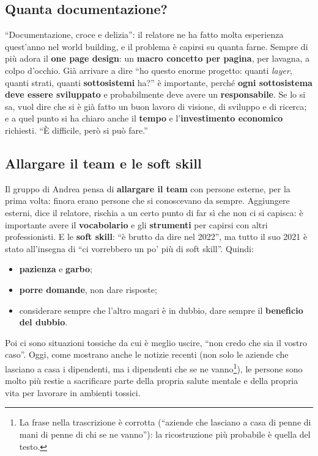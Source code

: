 \subsection{Quanta documentazione?}

``Documentazione, croce e delizia'': il relatore ne ha fatto molta esperienza
quest'anno nel world building, e il problema è capirsi su quanta farne. Sempre di
più adora il \textbf{one page design}: un \textbf{macro concetto per pagina}, per
lavagna, a colpo d'occhio. Già arrivare a dire ``ho questo enorme progetto:
quanti \emph{layer}, quanti strati, quanti \textbf{sottosistemi} ha?'' è
importante, perché \textbf{ogni sottosistema deve essere sviluppato} e
probabilmente deve avere un \textbf{responsabile}. Se lo si sa, vuol dire che si è
già fatto un buon lavoro di visione, di sviluppo e di ricerca; e a quel punto si
ha chiaro anche il \textbf{tempo} e l'\textbf{investimento economico} richiesti.
``È difficile, però si può fare.''

\subsection{Allargare il team e le soft skill}

Il gruppo di Andrea pensa di \textbf{allargare il team} con persone esterne, per la
prima volta: finora erano persone che si conoscevano da sempre. Aggiungere esterni,
dice il relatore, rischia a un certo punto di far sì che non ci si capisca: è
importante avere il \textbf{vocabolario} e gli \textbf{strumenti} per capirsi con
altri professionisti. E le \textbf{soft skill}: ``è brutto da dire nel 2022'', ma
tutto il suo 2021 è stato all'insegna di ``ci vorrebbero un po' più di soft
skill''. Quindi:
\begin{itemize}
  \item \textbf{pazienza} e \textbf{garbo};
  \item \textbf{porre domande}, non dare risposte;
  \item considerare sempre che l'altro magari è in dubbio, dare sempre il
        \textbf{beneficio del dubbio}.
\end{itemize}
Poi ci sono situazioni tossiche da cui è meglio uscire, ``non credo che sia il
vostro caso''. Oggi, come mostrano anche le notizie recenti (non solo le aziende
che lasciano a casa i dipendenti, ma i dipendenti che se ne
vanno\footnote{La frase nella trascrizione è corrotta (``aziende che lasciano a
casa di penne di mani di penne di chi se ne vanno''): la ricostruzione più
probabile è quella del testo.}), le persone sono molto più restie a sacrificare
parte della propria salute mentale e della propria vita per lavorare in ambienti
tossici.

